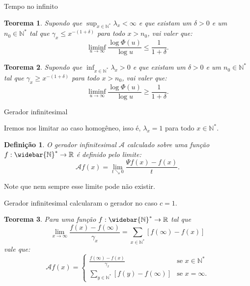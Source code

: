 \documentclass[xcolor=pdftex,dvipsnames]{beamer}
\newcommand{\AAA}{{\mathcal{A}}}
\newcommand{\Nz}{{\mathbb{N^*}}}
\newcommand{\Nzb}{{\mathbb{\widebar{N}^*}}}
\newcommand{\R}{{\mathbb{R}}}
\newtheorem{teorema}{Teorema}
\newtheorem{definicao}{Definição}
\begin{document}
\begin{frame}{Tempo no infinito}

  \begin{teorema}
    Supondo que $\sup_{x\in\Nz}\lambda_x < \infty$ e que existam um
    $\delta>0$ e um $n_0 \in \Nz$ tal que $\gamma_x \leq
    x^{-(1+\delta)}$ para todo $x > n_0$, vai valer que:
    \begin{displaymath}
      \liminf_{u \to \infty} \frac{\log \Phi(u)}{\log u}  \leq
      \frac{1}{1+\delta} .
    \end{displaymath}
  \end{teorema}

  \begin{teorema}
    Supondo que $\inf_{x\in\Nz}\lambda_x > 0$ e que existam um
    $\delta>0$ e um $n_0 \in \Nz$ tal que $\gamma_x \geq
    x^{-(1+\delta)}$ para todo $x > n_0$, vai valer que:
    \begin{displaymath}
      \liminf_{u \to \infty} \frac{\log \Phi(u)}{\log u}  \geq
      \frac{1}{1+\delta} .
    \end{displaymath}
  \end{teorema}
\end{frame}



\begin{frame}{Gerador infinitesimal}

  Iremos nos limitar ao caso homogêneo, isso é, $\lambda_x = 1$ para
  todo $x \in \Nz$.

  \begin{definicao}
    O gerador infinitesimal $\AAA$ calculado sobre uma função $f: \Nzb
    \to \R$ é definido pelo limite:
    \begin{displaymath}
      \AAA f (x) = \lim_{t \searrow 0} \frac{\Psi f (x) - f(x)}{t}.
    \end{displaymath}
  \end{definicao}
  
  Note que nem sempre esse limite pode não existir.

\end{frame}  


\begin{frame}{Gerador infinitesimal}
  \cite{kendall:56} calcularam o gerador no caso $c = 1$.

  \begin{teorema}
  Para uma função $f: \Nzb \to \R$ tal que
  \begin{displaymath}
    \lim_{x \to \infty}
    \frac{f(x) - f(\infty)}{\gamma_x} = \sum_{x \in \Nz}
    [f(\infty) - f(x)]
  \end{displaymath}
  vale que:
  \begin{displaymath}
    \AAA f (x) = \begin{cases}
      \displaystyle
      \frac{f(\infty) - f(x)}{\gamma_x} & \text{se } x \in \Nz\\
      \displaystyle
      \sum_{y\in \Nz} [f(y) - f(\infty)] & \text{se } x = \infty.
    \end{cases}
  \end{displaymath}
\end{teorema}
\end{frame}
\end{document}
